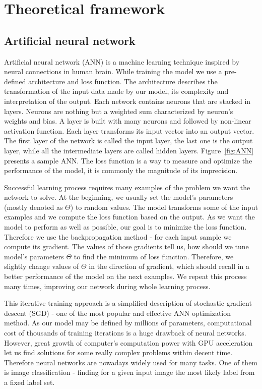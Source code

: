 \documentclass{article}
\begin{document}
\section{Theoretical framework}
\subsection{Artificial neural network}

Artificial neural network (ANN) is a machine learning technique inspired by neural connections in human brain. While training the model we use a pre-defined architecture and loss function. The architecture describes the transformation of the input data made by our model, its complexity and interpretation of the output. Each network contains neurons that are stacked in layers. Neurons are nothing but a weighted sum characterized by neuron's weights and bias. A layer is built with many neurons and followed by non-linear activation function. Each layer transforms its input vector into an output vector. The first layer of the network is called the input layer, the last one is the output layer, while all the intermediate layers are called hidden layers. Figure~\ref{fig:ANN} presents a sample ANN. The loss function is a way to measure and optimize the performance of the model, it is commonly the magnitude of its imprecision. 
\par
Successful learning process requires many examples of the problem we want the network to solve. At the beginning, we usually set the model's parameters (mostly denoted as $\Theta$) to random values. The model transforms some of the input examples and we compute the loss function based on the output. As we want the model to perform as well as possible, our goal is to minimize the loss function. Therefore we use the backpropagation method - for each input sample we compute its gradient. The values of those gradients tell us, how should we tune model's parameters $\Theta$ to find the minimum of loss function. Therefore, we slightly change values of $\Theta$ in the direction of gradient, which should recall in a better performance of the model on the next examples. We repeat this process many times, improving our network during whole learning process. 
\par
This iterative training approach is a simplified description of stochastic gradient descent (SGD) - one of the most popular and effective ANN optimization method. As our model may be defined by millions of parameters, computational cost of thousands of training iterations is a huge drawback of neural networks. However, great growth of computer's computation power with GPU acceleration let us find solutions for some really complex problems within decent time.  Therefore neural networks are nowadays widely used for many tasks. One of them is image classification - finding for a given input image the most likely label from a fixed label set.
\end{document}
